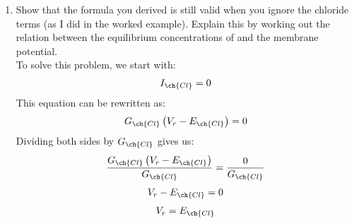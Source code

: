 \documentclass[11pt]{article}
\begin{document}
\begin{enumerate}[label=\arabic*.]
\begin{enumerate}[label=(\alph*)]
\newpage
\item
Show that the formula you derived is still valid when you ignore the chloride terms (as I did in the worked example\text{*}). Explain this by working out the relation between the equilibrium concentrations of  and the membrane potential.
\vspace*{1\baselineskip}
\\
To solve this problem, we start with:
\begin{align*}
I_{\ch{Cl}} = 0
\end{align*}
This equation can be rewritten as:
\begin{align*}
G_{\ch{Cl}} \left(V_r - E_{\ch{Cl}}\right) = 0
\end{align*}
Dividing both sides by $G_{\ch{Cl}}$ gives us:
\begin{align*}
\frac{G_{\ch{Cl}} \left(V_r - E_{\ch{Cl}}\right)} {G_{\ch{Cl}}} = \frac{0} {G_{\ch{Cl}}}
\end{align*}
\begin{align*}
V_r - E_{\ch{Cl}} = 0
\end{align*}
\begin{align*}
V_r = E_{\ch{Cl}}
\end{align*}






\end{enumerate}













\end{enumerate}
\end{document}
